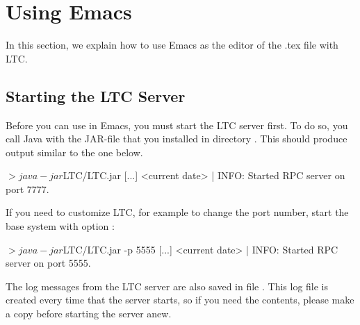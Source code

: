 \section{Using Emacs} \label{sec:emacs}

In this section, we explain how to use Emacs as the editor of the .tex file with LTC.


\subsection{Starting the LTC Server}

Before you can use  in Emacs, you must start the LTC server first.  To do so, you call Java with the JAR-file that you installed in directory .  This should produce output similar to the one below. 

\begin{CodeVerbatim}
$> java -jar $LTC/LTC.jar 
[...]
<current date> | INFO: 	Started RPC server on port 7777.
\end{CodeVerbatim}

If you need to customize LTC, for example to change the port number, start the base system with option :

\begin{CodeVerbatim}
$> java -jar $LTC/LTC.jar -p 5555
[...]
<current date> | INFO: 	Started RPC server on port 5555.
\end{CodeVerbatim}

The log messages from the LTC server are also saved in file .  This log file is created every time that the server starts, so if you need the contents, please make a copy before starting the server anew.

